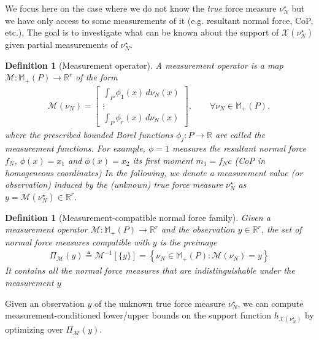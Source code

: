 \documentclass[11pt,a4paper]{article}
\theoremstyle{plain}
\newtheorem{definition}[theorem]{Definition}
\newcommand{\R}{\mathbb{R}}
\newcommand{\X}{\mathcal X}
\begin{document}
We focus here on the case where we do not know the \textit{true} force measure $\nu_N^\star$ but we have only access to some measurements of it (e.g. resultant normal force, CoP, etc.).
The goal is to investigate what can be known about the support of $\X(\nu_N^\star)$ given partial measurements of $\nu_N^\star$.
\begin{definition}[Measurement operator]\label{def:measurement_operator}
    A \textit{measurement operator} is a map $\mathcal M:\mathbb M_+(P)\rightarrow\mathbb R^r$ of the form
    \begin{align}
    \mathcal M(\nu_N) =
    \begin{bmatrix}
    \displaystyle\int_P \phi_1(x)\,d\nu_N(x)\\
    \vdots\\
    \displaystyle\int_P \phi_r(x)\,d\nu_N(x)
    \end{bmatrix},\qquad \forall \nu_N \in \mathbb M_+(P),
    \end{align}
    where the prescribed bounded Borel functions
    $\phi_j:P\rightarrow\mathbb R$ are called the \textit{measurement functions}. For example, $\phi=1$ measures the resultant normal force
    $f_N$, $\phi(x)=x_1$ and $\phi(x)=x_2$ its first moment $m_1=f_Nc$ (CoP in homogeneous coordinates)
    In the following, we denote a measurement value (or observation) induced by the (unknown) true force measure $\nu_N^\star$ as $y = \mathcal M(\nu_N^\star) \in\mathbb R^r$.
\end{definition}

\begin{definition}[Measurement-compatible normal force family]
    Given a measurement operator $\mathcal M:\mathbb M_+(P)\rightarrow\mathbb R^r$ and the observation $y\in\R^r$, the set of \textit{normal force measures compatible with $y$} is
    the preimage
    \begin{align}
    \Pi_{\mathcal M}(y) \triangleq \mathcal M^{-1}[\{y\}]=\left\{\nu_N\in\mathbb M_+(P):\mathcal M(\nu_N)=y\right\}
    \end{align}
    It contains all the normal force measures that are indistinguishable under the measurement $y$
\end{definition}

Given an observation $y$ of the unknown true force measure $\nu_N^\star$, we can compute measurement-conditioned lower/upper bounds on the support function $h_{\X(\nu_N^\star)}$ by optimizing over $\Pi_{\mathcal M}(y)$.
\end{document}
